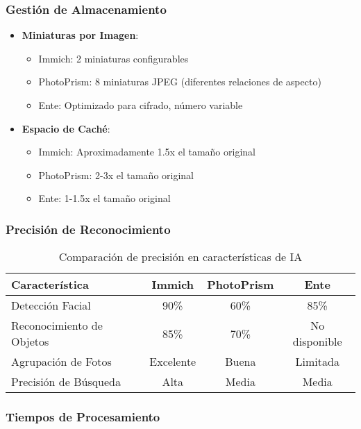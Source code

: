 \subsubsection{Gestión de Almacenamiento}

\begin{itemize}
    \item \textbf{Miniaturas por Imagen}:
    \begin{itemize}
        \item Immich: 2 miniaturas configurables
        \item PhotoPrism: 8 miniaturas JPEG (diferentes relaciones de aspecto)
        \item Ente: Optimizado para cifrado, número variable
    \end{itemize}

    \item \textbf{Espacio de Caché}:
    \begin{itemize}
        \item Immich: Aproximadamente 1.5x el tamaño original
        \item PhotoPrism: 2-3x el tamaño original
        \item Ente: 1-1.5x el tamaño original
    \end{itemize}
\end{itemize}

\subsubsection{Precisión de Reconocimiento}

\begin{table}[H]
\centering
\begin{tabular}{|l|c|c|c|}
\hline
\textbf{Característica} & \textbf{Immich} & \textbf{PhotoPrism} & \textbf{Ente} \\
\hline
Detección Facial & 90\% & 60\% & 85\% \\
Reconocimiento de Objetos & 85\% & 70\% & No disponible \\
Agrupación de Fotos & Excelente & Buena & Limitada \\
Precisión de Búsqueda & Alta & Media & Media \\
\hline
\end{tabular}
\caption{Comparación de precisión en características de IA}
\label{tab:ai_accuracy}
\end{table}

\subsubsection{Tiempos de Procesamiento}

